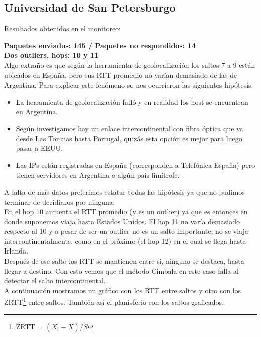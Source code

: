 \subsection{Universidad de San Petersburgo}

Resultados obtenidos en el monitoreo:\\

\smallskip

\bigskip

\textbf{Paquetes enviados: 145 / Paquetes no respondidos: 14}\\

\textbf{Dos outliers, hops: 10 y 11}\\

Algo extraño es que según la herramienta de geolocalización los saltos 7 a 9 están ubicados en España, pero sus RTT promedio no varían demasiado de las de Argentina. Para explicar este fenómeno se nos ocurrieron las siguientes hipótesis:
\begin{itemize}
\item La herramienta de geolocalización falló y en realidad los host se encuentran en Argentina.
\item Según investigamos hay un enlace intercontinental con fibra óptica que va desde Las Toninas hasta Portugal, quizás esta opción es mejor para luego pasar a EEUU.
\item Las IPs están registradas en España (corresponden a Telefónica España) pero tienen servidores en Argentina o algún país limítrofe.
\end{itemize}

A falta de más datos preferimos estatar todas las hipótesis ya que no pudimos terminar de decidirnos por ninguna.\\

En el hop 10 aumenta el RTT promedio (y es un outlier) ya que es entonces en donde suponemos viaja hasta Estados Unidos. El hop 11 no varía demasiado respecto al 10 y a pesar de ser un outlier no es un salto importante, no se viaja intercontinentalmente, como en el próximo (el hop 12) en el cual se llega hasta Irlanda.\\

Después de ese salto los RTT se mantienen entre si, ninguno se destaca, hasta llegar a destino. Con esto vemos que el método Cimbala en este caso falla al detectar el salto intercontinental.\\

A continuación mostramos un gráfico con los RTT entre saltos y otro con los ZRTT\footnote{ZRTT = $(X_i - \bar{X}) / S$}  entre saltos. También así el planisferio con los saltos graficados.


